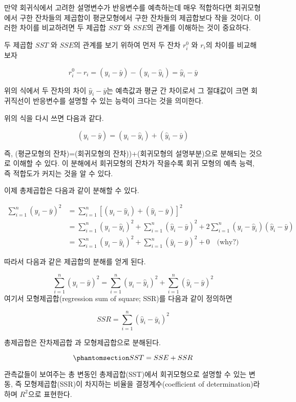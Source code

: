\documentclass[
  11pt,
  a4paper,
  oneside]{scrbook}
\theoremstyle{definition}
\theoremstyle{plain}
\theoremstyle{definition}
\theoremstyle{definition}
\theoremstyle{remark}
\begin{document}
만약 회귀식에서 고려한 설명변수가 반응변수를 예측하는데 매우 적합하다면
회귀모형에서 구한 잔차들의 제곱합이 평균모형에서 구한 잔차들의
제곱합보다 작을 것이다. 이러한 차이를 비교하려면 두 제곱합 \(SST\) 와
\(SSE\)의 관계를 이해하는 것이 중요하다.

두 제곱합 \(SST\) 와 \(SSE\)의 관계를 보기 위하여 먼저 두 잔차 \(r^0_i\)
와 \(r_i\)의 차이를 비교해 보자

\[ r^0_i - r_i = (y_i - \bar y) - (y_i - \hat y_i) = \hat y_i - \bar y \]

위의 식에서 두 잔차의 차이 \(\hat y_i - \bar y\)는 예측값과 평균 간
차이로서 그 절댸값이 크면 회귀직선이 반응변수를 설명할 수 있는 능력이
크다는 것을 의미한다.

위의 식을 다시 쓰면 다음과 같다.

\[  (y_i - \bar y) = (y_i - \hat y_i) + (\hat y_i - \bar y) \]

즉, (평균모형의 잔차)=(회귀모형의 잔차))+(회귀모형의 설명부분)으로
분해되는 것으로 이해할 수 있다. 이 분해에서 회귀모형의 잔차가 작을수록
회귀 모형의 예측 능력, 즉 적합도가 커지는 것을 알 수 있다.

이제 총제곱합은 다음과 같이 분해할 수 있다.

\[
\begin{align}
 \sum^n_{i=1}(y_i - \bar y)^2 &=  \sum^n_{i=1}[(y_i-\hat y_i)+(\hat y_i - \bar y)]^2 \\
 &= \sum^n_{i=1}(y_i-\hat y_i)^2+\sum^n_{i=1}(\hat y_i - \bar y)^2
        + 2\sum^n_{i=1}(y_i-\hat y_i)(\hat y_i-\bar y)  \\
 &= \sum^n_{i=1}(y_i-\hat y_i)^2+\sum^n_{i=1}(\hat y_i - \bar y)^2 + 0 \quad \text{(why?)}
\end{align}
\]

따라서 다음과 같은 제곱합의 분해를 얻게 된다.

\[ 
\sum^n_{i=1}(y_i - \bar y)^2 = \sum^n_{i=1}(y_i-\hat y_i)^2+\sum^n_{i=1}(\hat y_i - \bar y)^2
\] 여기서 모형제곱합(regression sum of square; SSR)를 다음과 같이
정의하면

\[  SSR = \sum^n_{i=1}(\hat y_i-\bar y_i)^2 \]

총제곱합은 잔차제곱합 과 모형제곱합으로 분해된다.

\begin{equation}\phantomsection\label{eq-ssqdecomp}{
 SST = SSE + SSR 
}\end{equation}

관측값들이 보여주는 총 변동인 총제곱합(SST)에서 회귀모형으로 설명할 수
있는 변동, 즉 모형제곱합(SSR)이 차지하는 비율을 결정계수(coefficient of
determination)라 하며 \(R^2\)으로 표현한다.
\end{document}
